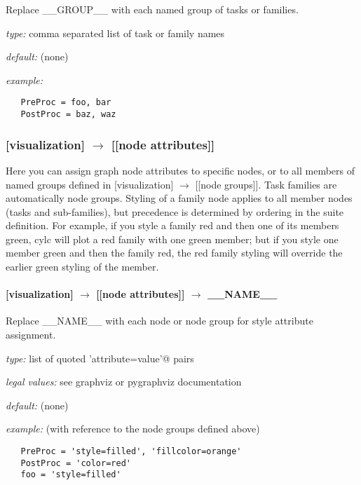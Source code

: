 Replace \_\_GROUP\_\_ with each named group of tasks or families.

\begin{myitemize}
    \item {\em type:} comma separated list of task or family names
    \item {\em default:} (none)
    \item {\em example:}
\begin{lstlisting}
   PreProc = foo, bar
   PostProc = baz, waz
\end{lstlisting}
\end{myitemize}

\subsubsection[{[[}node attributes{]]}]{[visualization] $\rightarrow$ [[node attributes]]}

Here you can assign graph node attributes to specific nodes, or to all
members of named groups defined in [visualization] $\rightarrow$ [[node
groups]]. Task families are automatically node groups. Styling of a
family node applies to all member nodes (tasks and sub-families), but
precedence is determined by ordering in the suite definition.  For
example, if you style a family red and then one of its members green,
cylc will plot a red family with one green member; but if you style one
member green and then the family red, the red family styling will
override the earlier green styling of the member.

\paragraph[\_\_NAME\_\_]{[visualization] $\rightarrow$ [[node attributes]] $\rightarrow$ \_\_NAME\_\_}

Replace \_\_NAME\_\_ with each node or node group for style attribute
assignment.

\begin{myitemize}
    \item {\em type:} list of quoted \lstinline@'attribute=value'@ pairs
    \item {\em legal values:} see graphviz or pygraphviz documentation
    \item {\em default:} (none)
    \item {\em example:} (with reference to the node groups defined above)
\begin{lstlisting}
   PreProc = 'style=filled', 'fillcolor=orange'
   PostProc = 'color=red'
   foo = 'style=filled'
\end{lstlisting}
\end{myitemize}

